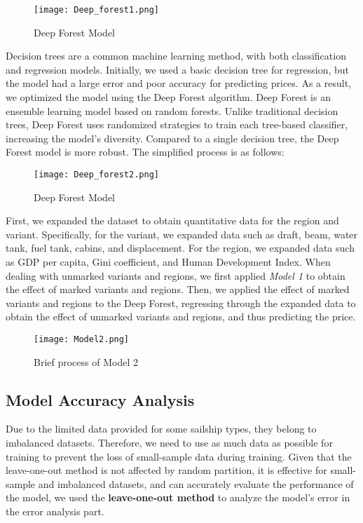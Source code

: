 \documentclass[12pt]{article}  %
\begin{document}
\begin{figure}[htbp]
    \centering
    \texttt{[image: Deep\_forest1.png]}
    \caption{Deep Forest Model}\label{fig:DF1}
\end{figure}

Decision trees are a common machine learning method, with both classification and regression models. Initially, we used a basic decision tree for regression, but the model had a large error and poor accuracy for predicting prices. As a result, we optimized the model using the Deep Forest algorithm. Deep Forest is an ensemble learning model based on random forests. Unlike traditional decision trees, Deep Forest uses randomized strategies to train each tree-based classifier, increasing the model's diversity. Compared to a single decision tree, the Deep Forest model is more robust. The simplified process is as follows:

\begin{figure}[htbp]
    \centering
    \texttt{[image: Deep\_forest2.png]}
    \caption{Deep Forest Model}\label{fig:DF2}
\end{figure}


First, we expanded the dataset to obtain quantitative data for the region and variant. Specifically, for the variant, we expanded data such as draft, beam, water tank, fuel tank, cabins, and displacement. For the region, we expanded data such as GDP per capita, Gini coefficient, and Human Development Index. When dealing with unmarked variants and regions, we first applied \emph{Model 1} to obtain the effect of marked variants and regions. Then, we applied the effect of marked variants and regions to the Deep Forest, regressing through the expanded data to obtain the effect of unmarked variants and regions, and thus predicting the price.

\begin{figure}[htbp]
    \centering
    \texttt{[image: Model2.png]}
    \caption{Brief process of Model 2}\label{fig:Model2}
\end{figure}


\subsection{Model Accuracy Analysis}
Due to the limited data provided for some sailship types, 
they belong to imbalanced datasets. 
Therefore, we need to use as much data as possible for training to prevent the loss of small-sample data during training. 
Given that the leave-one-out method is not affected by random partition, 
it is effective for small-sample and imbalanced datasets, 
and can accurately evaluate the performance of the model, 
we used the \textbf{leave-one-out method} to analyze the model's error in the error analysis part.
  
\end{document}
